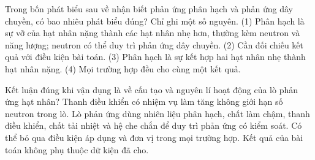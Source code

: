 \begin{ex}
Trong bốn phát biểu sau về nhận biết phản ứng phân hạch và phản ứng dây chuyền, có bao nhiêu phát biểu đúng? Chỉ ghi một số nguyên. (1) Phân hạch là sự vỡ của hạt nhân nặng thành các hạt nhân nhẹ hơn, thường kèm neutron và năng lượng; neutron có thể duy trì phản ứng dây chuyền. (2) Cần đối chiếu kết quả với điều kiện bài toán. (3) Phân hạch là sự kết hợp hai hạt nhân nhẹ thành hạt nhân nặng. (4) Mọi trường hợp đều cho cùng một kết quả.
\end{ex}

\begin{ex}
Kết luận đúng khi vận dụng là về cấu tạo và nguyên lí hoạt động của lò phản ứng hạt nhân?
\choice
{Thanh điều khiển có nhiệm vụ làm tăng không giới hạn số neutron trong lò.}
{\True Lò phản ứng dùng nhiên liệu phân hạch, chất làm chậm, thanh điều khiển, chất tải nhiệt và hệ che chắn để duy trì phản ứng có kiểm soát.}
{Có thể bỏ qua điều kiện áp dụng và đơn vị trong mọi trường hợp.}
{Kết quả của bài toán không phụ thuộc dữ kiện đã cho.}
\end{ex}

